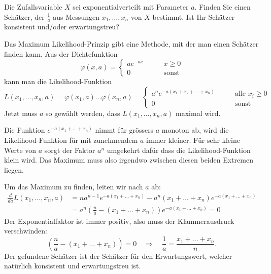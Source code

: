 Die Zufallsvariable $X$ sei exponentialverteilt mit Parameter $a$.
Finden Sie einen Schätzer, der $\frac1a$ aus Messungen $x_1,\dots,x_n$
von $X$ bestimmt. Ist Ihr Schätzer konsistent und/oder erwartungstreu?

\begin{loesung}
Das Maximum Likelihood-Prinzip gibt eine Methode, mit der man einen
Schätzer finden kann. Aus der Dichtefunktion
\[
\varphi(x,a)=\begin{cases}
ae^{-ax}&\qquad x \ge 0\\
0&\qquad\text{sonst}
\end{cases}
\]
kann man die Likelihood-Funktion
\[
L(x_1,\dots,x_n,a)=\varphi(x_1,a)\dots\varphi(x_n,a)=
\begin{cases}
a^ne^{-a(x_1+x_2+\dots+x_n)}&\qquad \text{alle $x_i \ge 0$}\\
0&\qquad\text{sonst}
\end{cases}
\]
Jetzt muss $a$ so gewählt werden, dass $L(x_1,\dots,x_n,a)$
maximal wird.

Die Funktion $e^{-a(x_1+\dots+x_n)}$ nimmt für grössers $a$ monoton ab,
wird die Likelihood-Funktion für mit zunehmendem $a$ immer kleiner. Für
sehr kleine Werte von $a$ sorgt der Faktor $a^n$ umgekehrt dafür dass
die Likelihood-Funktion klein wird. Das Maximum muss also irgendwo
zwischen diesen beiden Extremen liegen.

Um das Maximum zu finden, leiten wir nach $a$ ab:
\begin{align*}
\frac{d}{da}L(x_1,\dots,x_n,a)&=na^{n-1}e^{-a(x_1+\dots+x_n)}-a^n(x_1+\dots+x_n)e^{-a(x_1+\dots+x_n)}\\
&=a^n
\left(\frac{n}a-(x_1+\dots+x_n)\right)
e^{-a(x_1+\dots+x_n)}=0
\end{align*}
Der Exponentialfaktor ist immer positiv, also muss der Klammerausdruck
verschwinden:
\[
\left(\frac{n}a-(x_1+\dots+x_n)\right)=0
\quad\Rightarrow\quad
\frac1a=\frac{x_1+\dots+x_n}{n}.
\]
Der gefundene Schätzer ist der Schätzer für den Erwartungswert,
welcher natürlich konsistent und erwartungstreu ist.
\end{loesung}

